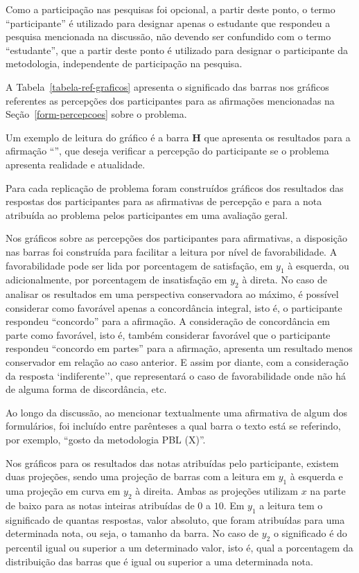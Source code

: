 Como a participação nas pesquisas foi opcional, a partir deste ponto, 
o termo  ``participante'' é utilizado para designar apenas 
o estudante que respondeu a pesquisa mencionada na discussão,
não devendo ser confundido com o termo ``estudante'', que a partir deste ponto
é utilizado para designar o participante da metodologia, independente
de participação na pesquisa.

A Tabela~\ref{tabela-ref-graficos} apresenta o significado das barras
nos gráficos referentes as percepções dos participantes para as
afirmações mencionadas na Seção~\ref{form-percepcoes} sobre
o problema.



Um exemplo de leitura do gráfico é a barra \textbf{H} que apresenta
os resultados para a afirmação ``\LikertPH'', que deseja verificar
a percepção do participante se o problema apresenta realidade
e atualidade.

Para cada replicação de problema foram construídos gráficos
dos resultados das respostas dos participantes para as afirmativas
de percepção e para a nota atribuída ao problema pelos
participantes em uma avaliação geral.


Nos gráficos sobre as percepções dos participantes
para afirmativas, a disposição nas barras
foi construída para facilitar a leitura por nível de favorabilidade.
A favorabilidade pode ser lida por porcentagem de satisfação,
em $y_1$ à esquerda, ou adicionalmente, por porcentagem de
insatisfação em $y_2$ à direta.
No caso de analisar os resultados em uma perspectiva conservadora ao máximo,
é possível considerar como favorável apenas a concordância
integral, isto é, o participante respondeu ``concordo'' para
a afirmação.
A consideração de concordância em parte como favorável,
isto é, também considerar favorável que
o participante respondeu ``concordo em partes'' para a afirmação,
apresenta um resultado menos conservador em relação ao caso anterior.
E assim por diante, com a consideração da resposta `indiferente'', que
representará o caso de favorabilidade onde não há de alguma forma de
discordância, etc.

Ao longo da discussão, ao mencionar textualmente uma afirmativa de
algum dos formulários, foi incluído entre parênteses a qual barra o texto
está se referindo, por exemplo, ``gosto da metodologia PBL (X)''.

Nos gráficos para os resultados das notas atribuídas pelo participante,
existem duas projeções, sendo uma projeção de barras com
a leitura em $y_1$ à esquerda e uma projeção em curva
em $y_2$ à direita.
Ambas as projeções utilizam $x$ na parte de baixo para as notas
inteiras atribuídas de $0$ a $10$.
Em $y_1$ a leitura tem o significado de quantas respostas, valor absoluto,
que foram atribuídas para uma determinada nota, ou seja,
o tamanho da barra.
No caso de $y_2$ o significado é do percentil igual ou superior
a um determinado valor, isto é,
qual a porcentagem da distribuição das barras que é igual ou superior
a uma determinada nota.

